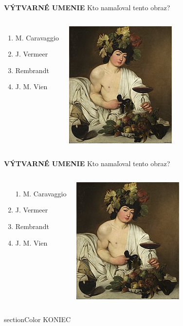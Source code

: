 \documentclass[dvipsnames]{beamer}
\begin{document}
\begin{frame}
	\textbf{VÝTVARNÉ UMENIE}
	\vskip 3mm
	Kto namaľoval tento obraz?
	\begin{columns}
	\begin{enumerate}
		\item M. Caravaggio
		\item J. Vermeer
		\item Rembrandt
		\item J. M. Vien
	\end{enumerate}
		\includegraphics[scale=0.75]{pazzo}
	\end{columns}

\end{frame}

\begin{frame}
	\textbf{VÝTVARNÉ UMENIE}
	\vskip 3mm
	Kto namaľoval tento obraz?
	\begin{columns}
	\column{0.5\textwidth}
	\begin{enumerate}
		\item[\textcolor{g}{1.}] \textcolor{g}{M. Caravaggio} \setcounter{enumi}{1}
		\item J. Vermeer
		\item Rembrandt
		\item J. M. Vien
	\end{enumerate}
	\column{0.5\textwidth}
		\includegraphics[scale=0.75]{pazzo}
	\end{columns}

\end{frame}
\begin{frame}
    \begin{beamercolorbox}[sep=12pt,center]{sectionColor}%
        KONIEC\par
    \end{beamercolorbox}
\end{frame}
\end{document}
